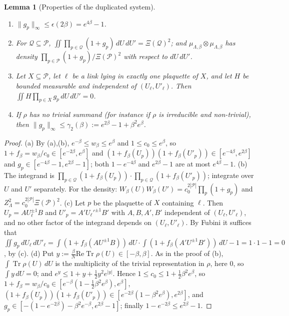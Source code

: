 \documentclass[11pt,a4paper]{article}
\newtheorem{lemma}[theorem]{Lemma}
\theoremstyle{definition}
\theoremstyle{remark}
\DeclareMathOperator{\Tr}{Tr}
\newcommand{\cP}{\mathcal{P}}
\newcommand{\dU}{\,dU}
\newcommand{\norm}[1]{\lVert #1\rVert}
\newcommand{\IIIlab}[2]{\cite[#1 \texttt{#2}]{III}}
\begin{document}
\begin{lemma}[Properties of the duplicated system]\label{mg:lem:dup}
\begin{enumerate}[label=(\alph*)]
\item $\norm{g_p}_\infty\le\epsilon(2\beta)=e^{4\beta}-1$.
\item For $\mathcal Q\subseteq\cP$, $\iint\prod_{p\in\mathcal Q}(1+g_p)\,dU\,dU'=\Xi(\mathcal Q)^2$; and
$\mu_{\Lambda,\beta}\otimes\mu_{\Lambda,\beta}$ has density $\prod_{p\in\cP}(1+g_p)/\Xi(\cP)^2$ with respect to $dU\,dU'$.
\item Let $X\subseteq\cP$, let $\ell$ be a link lying in exactly one plaquette of $X$, and let $H$ be bounded measurable and
independent of $(U_\ell,U'_\ell)$. Then $\iint H\prod_{p\in X}g_p\,dU\,dU'=0$.
\item If $\rho$ has no trivial summand (for instance if $\rho$ is irreducible and non-trivial), then
$\norm{g_p}_\infty\le\gamma_2(\beta):=e^{2\beta}-1+\beta^2e^\beta$.
\end{enumerate}
\end{lemma}

\begin{proof}
(a) By \IIIlab{Lemma}{al:lem:facts}(a),(b), $e^{-\beta}\le w_\beta\le e^\beta$ and $1\le c_0\le e^\beta$, so
$1+f_\beta=w_\beta/c_0\in[e^{-2\beta},e^{\beta}]$ and
$(1+f_\beta(U_p))(1+f_\beta(U'_p))\in[e^{-4\beta},e^{2\beta}]$ and $g_p\in[e^{-4\beta}-1,e^{2\beta}-1]$; both
$1-e^{-4\beta}$ and $e^{2\beta}-1$ are at most $e^{4\beta}-1$.
(b) The integrand is $\prod_{p\in\mathcal Q}(1+f_\beta(U_p))\cdot\prod_{p\in\mathcal Q}(1+f_\beta(U'_p))$; integrate over $U$ and $U'$
separately. For the density: $W_\beta(U)W_\beta(U')=c_0^{2|\cP|}\prod_p(1+g_p)$ and $Z_\Lambda^2=c_0^{2|\cP|}\Xi(\cP)^2$.
(c) Let $p$ be the plaquette of $X$ containing $\ell$. Then $U_p=AU_\ell^{\pm1}B$ and $U'_p=A'U_\ell'^{\pm1}B'$ with $A,B,A',B'$
independent of $(U_\ell,U'_\ell)$, and no other factor of the integrand depends on $(U_\ell,U'_\ell)$. By Fubini it suffices that
$\iint g_p\,dU_\ell\,dU'_\ell=\int(1+f_\beta(AU^{\pm1}B))\dU\cdot\int(1+f_\beta(A'U^{\pm1}B'))\dU-1=1\cdot1-1=0$, by
\IIIlab{Lemma}{al:lem:facts}(c).
(d) Put $y:=\frac\beta N\mathrm{Re}\Tr\rho(U)\in[-\beta,\beta]$. As in the proof of \IIIlab{Lemma}{al:lem:facts}(b), $\int\Tr\rho(U)\dU$ is the
multiplicity of the trivial representation in $\rho$, here $0$, so $\int y\dU=0$; and $e^y\le1+y+\frac12y^2e^{|y|}$. Hence $1\le c_0\le1+\frac12\beta^2e^\beta$,
so $1+f_\beta=w_\beta/c_0\in[e^{-\beta}(1-\frac12\beta^2e^\beta),e^\beta]$, $(1+f_\beta(U_p))(1+f_\beta(U'_p))\in[e^{-2\beta}(1-\beta^2e^\beta),e^{2\beta}]$, and
$g_p\in[-(1-e^{-2\beta})-\beta^2e^{-\beta},e^{2\beta}-1]$; finally $1-e^{-2\beta}\le e^{2\beta}-1$.
\end{proof}
\end{document}
